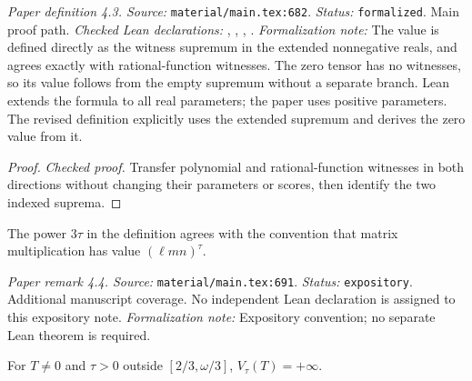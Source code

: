 \noindent\textit{Paper definition 4.3. Source:} \texttt{material/main.tex:682}.
\textit{Status:} \texttt{formalized}. Main proof path.
\textit{Checked Lean declarations:} , , , .
\textit{Formalization note:} The value is defined directly as the witness supremum in the extended nonnegative reals, and agrees exactly with rational-function witnesses. The zero tensor has no witnesses, so its value follows from the empty supremum without a separate branch. Lean extends the formula to all real parameters; the paper uses positive parameters. The revised definition explicitly uses the extended supremum and derives the zero value from it.

\begin{proof}
\leanok
{}
\textit{Checked proof.} Transfer polynomial and rational-function witnesses in both directions without changing their parameters or scores, then identify the two indexed suprema.
\end{proof}

\renewcommand{\thetheorem}{4.4}
\begin{remark}
\label{rem:value-exponent-convention}
The power $3\tau$ in the definition agrees with the convention that matrix multiplication has value $(\ell mn)^\tau$.
\end{remark}

\noindent\textit{Paper remark 4.4. Source:} \texttt{material/main.tex:691}.
\textit{Status:} \texttt{expository}. Additional manuscript coverage.
No independent Lean declaration is assigned to this expository note.
\textit{Formalization note:} Expository convention; no separate Lean theorem is required.

\renewcommand{\thetheorem}{4.5}
\begin{lemma}
\label{lem:value-outside-range}
\manuscriptproof
{}
\leanok
For $T\ne0$ and $\tau>0$ outside $[2/3,\omega/3]$, $V_\tau(T)=+\infty$.
\end{lemma}

